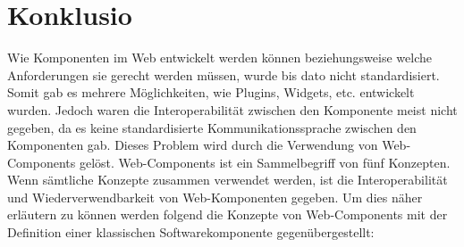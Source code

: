 \section{Konklusio}
\label{sec:5_Konklusion}

Wie Komponenten im Web entwickelt werden können beziehungsweise welche Anforderungen sie gerecht werden müssen, wurde bis dato nicht standardisiert. Somit gab es mehrere Möglichkeiten, wie Plugins, Widgets, etc. entwickelt wurden. Jedoch waren die Interoperabilität zwischen den Komponente meist nicht gegeben, da es keine standardisierte Kommunikationssprache zwischen den Komponenten gab. Dieses Problem wird durch die Verwendung von Web-Components gelöst. Web-Components ist ein Sammelbegriff von fünf Konzepten. Wenn sämtliche Konzepte zusammen verwendet werden, ist die Interoperabilität und Wiederverwendbarkeit von Web-Komponenten gegeben. Um dies näher erläutern zu können werden folgend die Konzepte von Web-Components mit der Definition einer klassischen Softwarekomponente gegenübergestellt:

